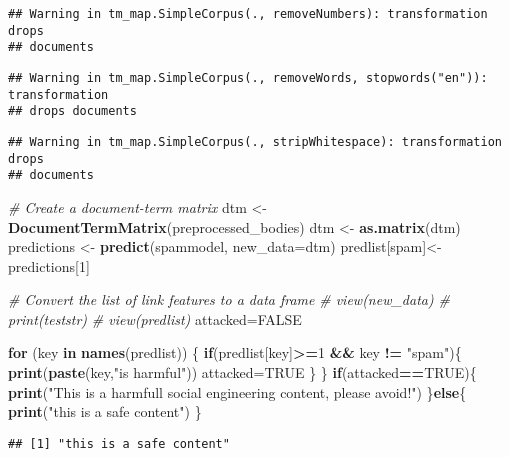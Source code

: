 \documentclass[
]{article}
\newenvironment{Shaded}{\begin{snugshade}}{\end{snugshade}}
\newcommand{\AttributeTok}[1]{\textcolor[rgb]{0.13,0.29,0.53}{#1}}
\newcommand{\CommentTok}[1]{\textcolor[rgb]{0.56,0.35,0.01}{\textit{#1}}}
\newcommand{\ConstantTok}[1]{\textcolor[rgb]{0.56,0.35,0.01}{#1}}
\newcommand{\ControlFlowTok}[1]{\textcolor[rgb]{0.13,0.29,0.53}{\textbf{#1}}}
\newcommand{\DecValTok}[1]{\textcolor[rgb]{0.00,0.00,0.81}{#1}}
\newcommand{\FunctionTok}[1]{\textcolor[rgb]{0.13,0.29,0.53}{\textbf{#1}}}
\newcommand{\NormalTok}[1]{#1}
\newcommand{\OtherTok}[1]{\textcolor[rgb]{0.56,0.35,0.01}{#1}}
\newcommand{\SpecialCharTok}[1]{\textcolor[rgb]{0.81,0.36,0.00}{\textbf{#1}}}
\newcommand{\StringTok}[1]{\textcolor[rgb]{0.31,0.60,0.02}{#1}}
\begin{document}
\begin{verbatim}
## Warning in tm_map.SimpleCorpus(., removeNumbers): transformation drops
## documents
\end{verbatim}

\begin{verbatim}
## Warning in tm_map.SimpleCorpus(., removeWords, stopwords("en")): transformation
## drops documents
\end{verbatim}

\begin{verbatim}
## Warning in tm_map.SimpleCorpus(., stripWhitespace): transformation drops
## documents
\end{verbatim}

\begin{Shaded}
\begin{Highlighting}[]
\CommentTok{\# Create a document{-}term matrix}
\NormalTok{dtm }\OtherTok{\textless{}{-}} \FunctionTok{DocumentTermMatrix}\NormalTok{(preprocessed\_bodies)}
\NormalTok{dtm }\OtherTok{\textless{}{-}} \FunctionTok{as.matrix}\NormalTok{(dtm)}
\NormalTok{predictions }\OtherTok{\textless{}{-}} \FunctionTok{predict}\NormalTok{(spammodel, }\AttributeTok{new\_data=}\NormalTok{dtm)}
\NormalTok{predlist[}\StringTok{\textquotesingle{}spam\textquotesingle{}}\NormalTok{]}\OtherTok{\textless{}{-}}\NormalTok{predictions[}\DecValTok{1}\NormalTok{]}

\CommentTok{\# Convert the list of link features to a data frame}
\CommentTok{\# view(new\_data)}
\CommentTok{\# print(teststr)}
\CommentTok{\# view(predlist)}
\NormalTok{attacked}\OtherTok{=}\ConstantTok{FALSE}

\ControlFlowTok{for}\NormalTok{ (key }\ControlFlowTok{in} \FunctionTok{names}\NormalTok{(predlist)) \{}
  \ControlFlowTok{if}\NormalTok{(predlist[key]}\SpecialCharTok{\textgreater{}=}\DecValTok{1} \SpecialCharTok{\&\&}\NormalTok{ key }\SpecialCharTok{!=} \StringTok{"spam"}\NormalTok{)\{}
    \FunctionTok{print}\NormalTok{(}\FunctionTok{paste}\NormalTok{(key,}\StringTok{"is harmful"}\NormalTok{))}
\NormalTok{    attacked}\OtherTok{=}\ConstantTok{TRUE}
\NormalTok{  \}}
\NormalTok{\}}
\ControlFlowTok{if}\NormalTok{(attacked}\SpecialCharTok{==}\ConstantTok{TRUE}\NormalTok{)\{}
  \FunctionTok{print}\NormalTok{(}\StringTok{"This is a harmfull social engineering content, please avoid!"}\NormalTok{)}
\NormalTok{\}}\ControlFlowTok{else}\NormalTok{\{}
  \FunctionTok{print}\NormalTok{(}\StringTok{"this is a safe content"}\NormalTok{)}
\NormalTok{\}}
\end{Highlighting}
\end{Shaded}

\begin{verbatim}
## [1] "this is a safe content"
\end{verbatim}
\end{document}
